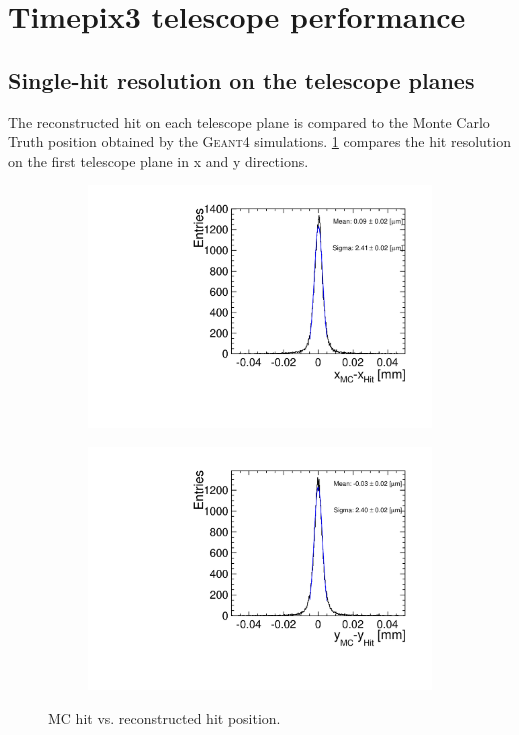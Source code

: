 \section{Timepix3 telescope performance}\label{sec:telescopePerformance}


\subsection{Single-hit resolution on the telescope planes}

The reconstructed hit on each telescope plane is compared to the Monte
Carlo Truth position obtained by the \textsc{Geant4}
simulations. \cref{fig:TelPlane0_MC_hit} compares the hit resolution
on the first telescope plane in x and y directions.


\begin{figure}[htbp] \centering
  \begin{subfigure}[b]{0.45\textwidth}
    \includegraphics[width=\textwidth]{figures/Telescope/telescopePlane0_MC_vs_hit_x.pdf}
    \caption{}
  \end{subfigure}\hfill
  \begin{subfigure}[b]{0.45\textwidth}
    \includegraphics[width=\textwidth]{figures/Telescope/telescopePlane0_MC_vs_hit_y.pdf}
    \caption{}
  \end{subfigure}
  \caption{MC hit vs. reconstructed hit position.}
  \label{fig:TelPlane0_MC_hit}
\end{figure}

